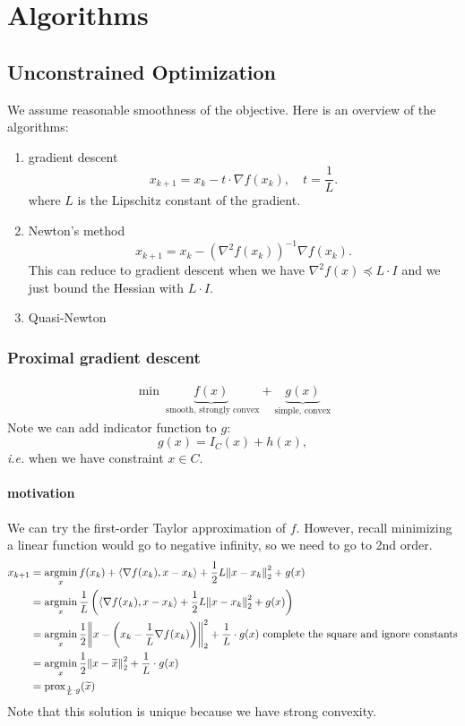 \documentclass[class=article,crop=false]{standalone}
\begin{document}
\newpage
\chapter{Algorithms}
\newpage
\section{Unconstrained Optimization}
We assume reasonable smoothness of the objective. Here is an overview of the algorithms:
\begin{enumerate}[label=(\arabic*)]
	\item gradient descent
		\[
			x_{k+1} = x_k - t \cdot  \nabla f(x_k), \quad t= \frac{1}{L}
		.\] 
		where $ L$ is the Lipschitz constant of the gradient.
	\item Newton's method
		\[
			x_{k+1} = x_k - \left( \nabla ^2 f(x_k) \right)^{-1} \nabla f(x_k)
		.\] 
		This can reduce to gradient descent when we have $ \nabla ^2 f(x) \preceq L \cdot I$ and we just bound the Hessian with $ L \cdot I$.
	\item Quasi-Newton
\end{enumerate}
\newpage
\subsection{Proximal gradient descent}
\begin{align*}
	\min \underbrace{ f(x)}_{ \text{ smooth, strongly convex} } + \underbrace{ g(x)}_{ \text{simple, convex}}  
\end{align*}
Note we can add indicator function to $ g$:
\[
	g(x) = I_{C}(x) + h(x)
,\] 
\emph{i.e.} when we have constraint $ x \in C$.
\subsubsection{motivation}
We can try the first-order Taylor approximation of $ f$. However, recall minimizing a linear function would go to negative infinity, so we need to go to 2nd order.
\begin{align*}
	x_{k+1} &= \operatorname*{argmin}_{x} f(x_k) + \langle \nabla f(x_k),x-x_k \rangle + \frac{1}{2} L{\left\lVert{ x-x_k}\right\rVert}_2^2 + g(x)\\
	&= \operatorname*{argmin}_x \frac{1}{L} \left(  \langle \nabla f(x_k),x-x_k \rangle + \frac{1}{2} L{\left\lVert{ x-x_k}\right\rVert}_2^2 + g(x)\right)  \\
	&= \operatorname*{argmin}_x \frac{1}{2} {\left\lVert{ x-\left(x_k - \frac{1}{L} \nabla f(x_k)\right)}\right\rVert}_2^2 + \frac{1}{L} \cdot g(x) \text{ complete the square and ignore constants}  \\
	&= \operatorname*{argmin}_x \frac{1}{2} {\left\lVert{ x-\widetilde{ x}}\right\rVert}_2^2 + \frac{1}{L} \cdot g(x)  \\
	&= \operatorname{prox}_{\frac{1}{L} \cdot g} (\widetilde{ x})
\end{align*}
Note that this solution is unique because we have strong convexity.
\end{document}

